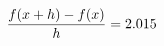 \documentclass[preview]{standalone}
\begin{document}
\begin{align*}
\special{dvisvgm:raw <g id='unique000'>}\frac{f(x+h)-f(x)}{h} = 2.015\special{dvisvgm:raw </g>}
\end{align*}
\end{document}
